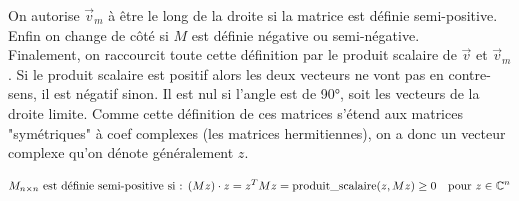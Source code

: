 \documentclass[french]{article}
\begin{document}
On autorise $\vec v_m$ à être le long de la droite si la matrice est définie semi-positive. Enfin on change de côté si $M$ est définie négative ou semi-négative.\\

Finalement, on raccourcit toute cette définition par le produit scalaire de $\vec v$ et $\vec v_m$. Si le produit scalaire est positif alors les deux vecteurs ne vont pas en contre-sens, il est négatif sinon. Il est nul si l'angle est de 90°, soit les vecteurs de la droite limite. Comme cette définition de ces matrices s'étend aux matrices "symétriques" à coef complexes (les matrices hermitiennes), on a donc un vecteur complexe qu'on dénote généralement $z$.

\[
M_{n \times n} \text{ est définie semi-positive si : } (Mz) \cdot z = z^T M z = \text{produit\textunderscore scalaire}(z, Mz) \geq 0 \quad \text{pour } z \in \mathbb{C}^n
\]
\end{document}
